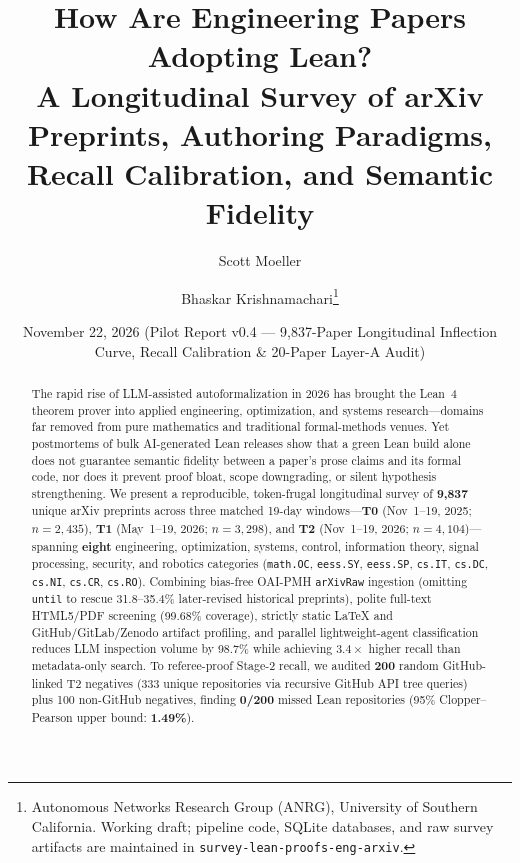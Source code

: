 \documentclass[11pt,letterpaper]{article}
\title{\textbf{How Are Engineering Papers Adopting Lean?}\\
\large A Longitudinal Survey of arXiv Preprints, Authoring Paradigms, Recall Calibration, and Semantic Fidelity}
\author{
  Scott Moeller \and Bhaskar Krishnamachari\thanks{Autonomous Networks Research Group (ANRG), University of Southern California. Working draft; pipeline code, SQLite databases, and raw survey artifacts are maintained in \texttt{survey-lean-proofs-eng-arxiv}.}
}
\date{November 22, 2026 \quad (Pilot Report v0.4 --- 9,837-Paper Longitudinal Inflection Curve, Recall Calibration \& 20-Paper Layer-A Audit)}
\begin{document}
\sloppy
\maketitle

\begin{abstract}
The rapid rise of LLM-assisted autoformalization in 2026 has brought the Lean~4 theorem prover into applied engineering, optimization, and systems research---domains far removed from pure mathematics and traditional formal-methods venues. Yet postmortems of bulk AI-generated Lean releases show that a green Lean build alone does not guarantee semantic fidelity between a paper's prose claims and its formal code, nor does it prevent proof bloat, scope downgrading, or silent hypothesis strengthening. We present a reproducible, token-frugal longitudinal survey of \textbf{9,837} unique arXiv preprints across three matched 19-day windows---\textbf{T0} (Nov~1--19, 2025; $n=2{,}435$), \textbf{T1} (May~1--19, 2026; $n=3{,}298$), and \textbf{T2} (Nov~1--19, 2026; $n=4{,}104$)---spanning \textbf{eight} engineering, optimization, systems, control, information theory, signal processing, security, and robotics categories (\texttt{math.OC}, \texttt{eess.SY}, \texttt{eess.SP}, \texttt{cs.IT}, \texttt{cs.DC}, \texttt{cs.NI}, \texttt{cs.CR}, \texttt{cs.RO}). Combining bias-free OAI-PMH \texttt{arXivRaw} ingestion (omitting \texttt{until} to rescue 31.8--35.4\% later-revised historical preprints), polite full-text HTML5/PDF screening (99.68\% coverage), strictly static LaTeX and GitHub/GitLab/Zenodo artifact profiling, and parallel lightweight-agent classification reduces LLM inspection volume by 98.7\% while achieving $3.4\times$ higher recall than metadata-only search. To referee-proof Stage-2 recall, we audited \textbf{200} random GitHub-linked T2 negatives (333 unique repositories via recursive GitHub API tree queries) plus 100 non-GitHub negatives, finding \textbf{0/200} missed Lean repositories (95\% Clopper--Pearson upper bound: \textbf{1.49\%}).


\end{abstract}
\end{document}
